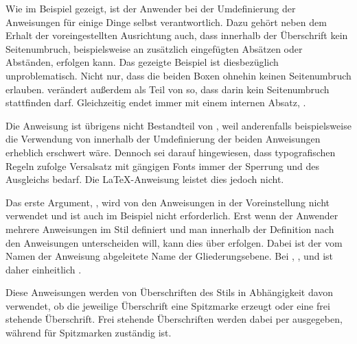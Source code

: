Wie im Beispiel gezeigt, ist der Anwender bei der Umdefinierung der
Anweisungen für einige Dinge selbst verantwortlich. Dazu gehört neben dem
Erhalt der voreingestellten Ausrichtung auch, dass innerhalb der Überschrift
kein Seitenumbruch, beispielsweise an zusätzlich eingefügten Absätzen oder
Abständen, erfolgen kann. Das gezeigte Beispiel ist diesbezüglich
unproblematisch. Nicht nur, dass die beiden Boxen ohnehin keinen Seitenumbruch
erlauben. \KOMAScript{} verändert außerdem  als Teil
von  so, dass darin kein Seitenumbruch stattfinden
darf. Gleichzeitig endet  immer mit einem internen Absatz,
.

Die Anweisung  ist übrigens nicht
Bestandteil von , weil anderenfalls beispielsweise die Verwendung
von  innerhalb der Umdefinierung der beiden Anweisungen
erheblich erschwert wäre. Dennoch sei darauf hingewiesen, dass typografischen
Regeln zufolge Versalsatz mit gängigen Fonts immer der Sperrung und des
Ausgleichs bedarf. Die \LaTeX-Anweisung  leistet dies
jedoch nicht.

Das erste Argument, , wird von den Anweisungen in der
Voreinstellung nicht verwendet und ist auch im Beispiel nicht
erforderlich. Erst wenn der Anwender mehrere Anweisungen im Stil
 definiert und man innerhalb der Definition nach den
Anweisungen unterscheiden will, kann dies über  erfolgen. Dabei
ist  der vom Namen der Anweisung abgeleitete Name der
Gliederungsebene. Bei ,
,  und
 ist  daher einheitlich
.%
\EndIndexGroup


\begin{Declaration}
\end{Declaration}
Diese Anweisungen werden von Überschriften des Stils
 in Abhängigkeit
davon verwendet, ob die jeweilige Überschrift eine Spitzmarke erzeugt oder
eine frei stehende Überschrift. Frei stehende Überschriften werden dabei per
 ausgegeben, während
 für Spitzmarken zuständig ist.

